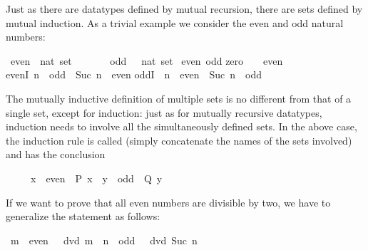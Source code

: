 %
\begin{isabellebody}%
\def\isabellecontext{Mutual}%
\isamarkupfalse%
%
\isamarkuptrue%
%
\begin{isamarkuptext}%
Just as there are datatypes defined by mutual recursion, there are sets defined
by mutual induction. As a trivial example we consider the even and odd
natural numbers:%
\end{isamarkuptext}%
\isamarkuptrue%
\ even\ {\isacharcolon}{\isacharcolon}\ {\isachardoublequote}nat\ set{\isachardoublequote}\isanewline
\ \ \ \ \ \ \ odd\ \ {\isacharcolon}{\isacharcolon}\ {\isachardoublequote}nat\ set{\isachardoublequote}\isanewline
\isanewline
\isamarkupfalse%
\ even\ odd\isanewline
{}\isanewline
zero{\isacharcolon}\ \ {\isachardoublequote}{}\ {\isasymin}\ even{\isachardoublequote}\isanewline
evenI{\isacharcolon}\ {\isachardoublequote}n\ {\isasymin}\ odd\ {\isasymLongrightarrow}\ Suc\ n\ {\isasymin}\ even{\isachardoublequote}\isanewline
oddI{\isacharcolon}\ \ {\isachardoublequote}n\ {\isasymin}\ even\ {\isasymLongrightarrow}\ Suc\ n\ {\isasymin}\ odd{\isachardoublequote}\isamarkupfalse%
%
\begin{isamarkuptext}%
\noindent
The mutually inductive definition of multiple sets is no different from
that of a single set, except for induction: just as for mutually recursive
datatypes, induction needs to involve all the simultaneously defined sets. In
the above case, the induction rule is called 
(simply concatenate the names of the sets involved) and has the conclusion
\begin{isabelle}%
\ \ \ \ \ {\isacharparenleft}{\isacharquery}x\ {\isasymin}\ even\ {\isasymlongrightarrow}\ {\isacharquery}P\ {\isacharquery}x{\isacharparenright}\ {\isasymand}\ {\isacharparenleft}{\isacharquery}y\ {\isasymin}\ odd\ {\isasymlongrightarrow}\ {\isacharquery}Q\ {\isacharquery}y{\isacharparenright}%
\end{isabelle}

If we want to prove that all even numbers are divisible by two, we have to
generalize the statement as follows:%
\end{isamarkuptext}%
\isamarkuptrue%
\ {\isachardoublequote}{\isacharparenleft}m\ {\isasymin}\ even\ {\isasymlongrightarrow}\ {}\ dvd\ m{\isacharparenright}\ {\isasymand}\ {\isacharparenleft}n\ {\isasymin}\ odd\ {\isasymlongrightarrow}\ {}\ dvd\ {\isacharparenleft}Suc\ n{\isacharparenright}{\isacharparenright}{\isachardoublequote}\isamarkupfalse%
\isamarkuptrue%
\isamarkupfalse%
\isamarkuptrue%
\isamarkupfalse%
\isamarkupfalse%
\isamarkupfalse%
\isamarkupfalse%
\isamarkupfalse%
\isamarkupfalse%
\isanewline
\isamarkupfalse%
\isamarkupfalse%
\end{isabellebody}%
